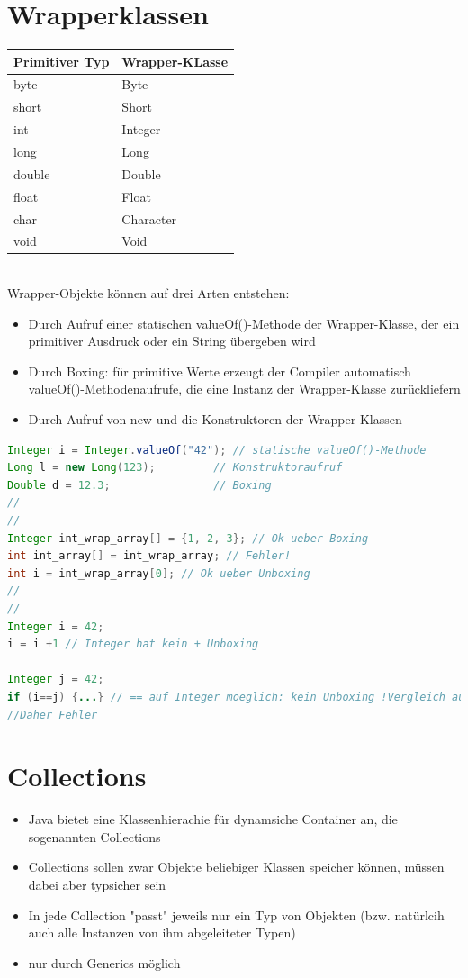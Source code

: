 \section{Wrapperklassen}
\begin{tabular}{|l|l|}
\hline
\textbf{Primitiver Typ} & \textbf{Wrapper-KLasse}\\\hline
byte & Byte \\\hline
short & Short \\\hline
int & Integer \\\hline
long & Long \\\hline
double & Double \\\hline
float & Float \\\hline
char & Character \\\hline
void & Void \\\hline
\end{tabular}
\\
Wrapper-Objekte können auf drei Arten entstehen:
\begin{itemize}
\item Durch Aufruf einer statischen valueOf()-Methode der Wrapper-Klasse, der ein primitiver Ausdruck oder ein String übergeben wird
\item Durch Boxing: für primitive Werte erzeugt der Compiler automatisch valueOf()-Methodenaufrufe, die eine Instanz der Wrapper-Klasse zurückliefern
\item Durch Aufruf von new und die Konstruktoren der Wrapper-Klassen
\end{itemize}

\begin{lstlisting}[language=JAVA]
Integer i = Integer.valueOf("42"); // statische valueOf()-Methode
Long l = new Long(123); 		// Konstruktoraufruf
Double d = 12.3;				// Boxing
//
//
Integer int_wrap_array[] = {1, 2, 3}; // Ok ueber Boxing
int int_array[] = int_wrap_array; // Fehler!
int i = int_wrap_array[0]; // Ok ueber Unboxing
//
//
Integer i = 42;
i = i +1 // Integer hat kein + Unboxing

Integer j = 42;
if (i==j) {...} // == auf Integer moeglich: kein Unboxing !Vergleich auf Identitaet! 
//Daher Fehler
\end{lstlisting}
\section{Collections}
\begin{itemize}
\item Java bietet eine Klassenhierachie für dynamsiche Container an, die sogenannten Collections
\item Collections sollen zwar Objekte beliebiger Klassen speicher können, müssen dabei aber typsicher sein
\item In jede Collection "passt" jeweils nur ein Typ von Objekten (bzw. natürlcih auch alle Instanzen von ihm abgeleiteter Typen)
\item nur durch Generics möglich
\end{itemize}
